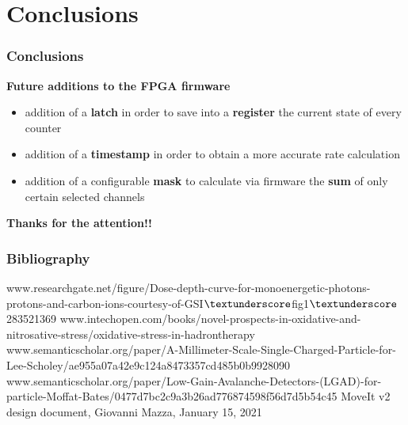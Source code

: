 \documentclass[aspectratio=169]{beamer}
\begin{document}
	\section{Conclusions}
	
	\begin{frame}
	\frametitle{Conclusions }
	\begin{center}
		\textbf{Future additions to the FPGA firmware}
	\end{center}
		\begin{itemize}
			\item addition of a \textbf{latch} in order to save into a \textbf{register} the current state of every counter 
			\item addition of a \textbf{timestamp} in order to obtain a more accurate rate calculation 
			\item addition of a configurable \textbf{mask} to calculate via firmware the \textbf{sum} of only certain selected channels 
			
		\end{itemize}
	
	\vspace{1 cm}
		\begin{center}
			\textbf{Thanks for the attention!!}
		\end{center}
		
	\end{frame}

	\begin{frame}
	\frametitle{Bibliography}
	{\scriptsize 
	\begin{thebibliography}{00}
		www.researchgate.net/figure/Dose-depth-curve-for-monoenergetic-photons-protons-and-carbon-ions-courtesy-of-GSI$\textunderscore$fig1$\textunderscore$283521369
		\newline
		www.intechopen.com/books/novel-prospects-in-oxidative-and-nitrosative-stress/oxidative-stress-in-hadrontherapy
		\newline
		www.semanticscholar.org/paper/A-Millimeter-Scale-Single-Charged-Particle-for-Lee-Scholey/ae955a07a42e9c124a8473357cd485b0b9928090
		\newline
		www.semanticscholar.org/paper/Low-Gain-Avalanche-Detectors-(LGAD)-for-particle-Moffat-Bates/0477d7bc2c9a3b26ad776874598f56d7d5b54c45
		\newline
		MoveIt v2 design document, Giovanni Mazza, January 15, 2021
	\end{thebibliography} }
	\end{frame}
\end{document}
